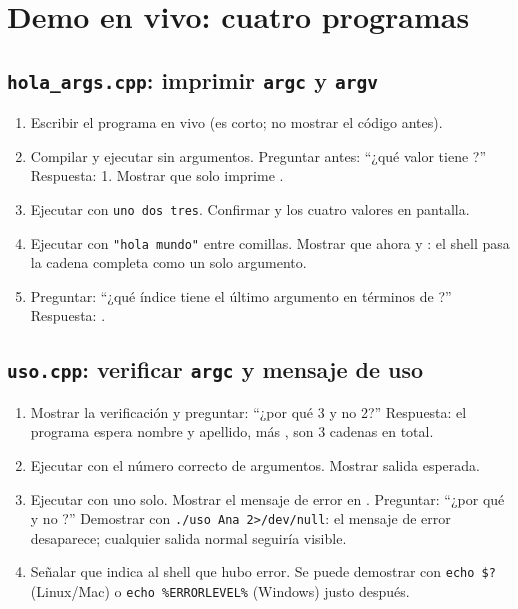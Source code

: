 \documentclass[12pt, oneside]{article}
\begin{document}
\section{Demo en vivo: cuatro programas}

\subsection{\texttt{hola\_args.cpp}: imprimir \texttt{argc} y \texttt{argv}}

\begin{notaprofesor}
  \begin{enumerate}
    \item Escribir el programa en vivo (es corto; no mostrar el código antes).
    \item Compilar y ejecutar sin argumentos.  Preguntar antes: ``¿qué
          valor tiene ?''  Respuesta: 1.  Mostrar que solo
          imprime .
    \item Ejecutar con \texttt{uno dos tres}.  Confirmar 
          y los cuatro valores en pantalla.
    \item Ejecutar con \texttt{"hola mundo"} entre comillas.  Mostrar
          que ahora  y : el
          shell pasa la cadena completa como un solo argumento.
    \item Preguntar: ``¿qué índice tiene el último argumento en
          términos de ?''  Respuesta: .
  \end{enumerate}
\end{notaprofesor}

\subsection{\texttt{uso.cpp}: verificar \texttt{argc} y mensaje de uso}

\begin{notaprofesor}
  \begin{enumerate}
    \item Mostrar la verificación  y preguntar:
          ``¿por qué 3 y no 2?''  Respuesta: el programa espera nombre
          y apellido, más , son 3 cadenas en total.
    \item Ejecutar con el número correcto de argumentos.  Mostrar
          salida esperada.
    \item Ejecutar con uno solo.  Mostrar el mensaje de error en
          .  Preguntar: ``¿por qué  y no ?''
          Demostrar con \texttt{./uso Ana 2>/dev/null}: el mensaje de
          error desaparece; cualquier salida normal seguiría visible.
    \item Señalar que  indica al shell que hubo error.
          Se puede demostrar con \texttt{echo \$?} (Linux/Mac) o
          \texttt{echo \%ERRORLEVEL\%} (Windows) justo después.
  \end{enumerate}
\end{notaprofesor}
\end{document}
